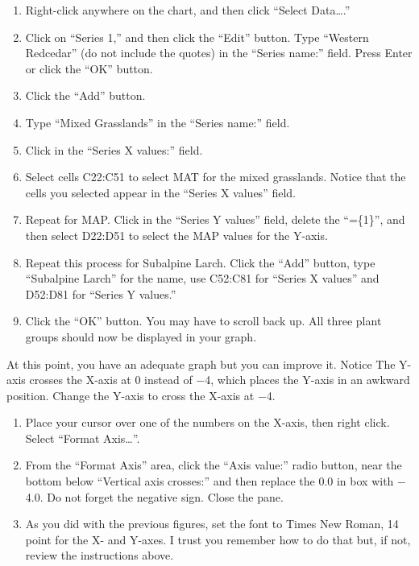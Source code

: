 \documentclass[11pt]{article}
\begin{document}
\begin{enumerate}[resume]
	\item Right-click anywhere on the chart, and then click “Select Data….”

	\item Click on “Series 1,” and then click the “Edit” button. Type “Western Redcedar” (do not include the quotes) in the “Series name:” field. Press Enter or click the “OK” button.

	\item Click the “Add” button.

	\item Type “Mixed Grasslands” in the “Series name:” field.

	\item Click in the “Series X values:” field.

	\item Select cells C22:C51 to select MAT for the mixed grasslands. Notice that the cells you selected appear in the “Series X values” field.

	\item Repeat for MAP. Click in the “Series Y values” field, delete the “=\{1\}”, and then select D22:D51 to select the MAP values for the Y-axis. 

	\item Repeat this process for Subalpine Larch. Click the “Add” button, type “Subalpine Larch” for the name, use C52:C81 for “Series X values” and D52:D81 for “Series Y values.” 

	\item Click the “OK” button. You may have to scroll back up. All three plant groups should now be displayed in your graph. 
\end{enumerate}

At this point, you have an adequate graph but you can improve it. Notice The Y-axis crosses the X-axis at 0 instead of $-$4, which places the Y-axis in an awkward position. Change the Y-axis to cross the X-axis at $-$4.

\begin{enumerate}[resume]
	\item Place your cursor over one of the numbers on the X-axis, then right click. Select “Format Axis…”.

	\item From the “Format Axis” area, click the “Axis value:” radio button, near the bottom below “Vertical axis crosses:” and then replace the 0.0 in box with $-$4.0. Do not forget the negative sign. Close the pane.

	\item As you did with the previous figures, set the font to Times New Roman, 14 point for the X- and Y-axes. I trust you remember how to do that but, if not, review the instructions above.
\end{enumerate}
\end{document}
